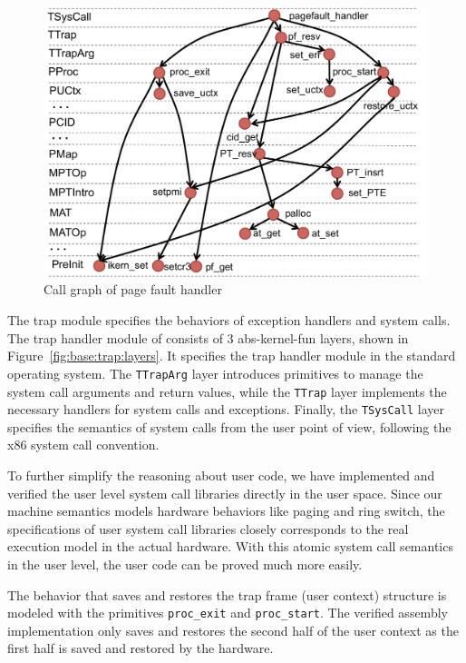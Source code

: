{
\begin{figure}\centering
\includegraphics[scale=0.5]{figs/pagefault}	
\caption{Call graph of page fault handler}
\label{fig:base:trap:pagefault}
\hrulefill
\end{figure}
}

The trap module specifies the behaviors of exception handlers and
\mCTOSbase{} system calls.
The trap handler module of \mCTOSbase{} consists of 3 abs-kernel-fun
layers, shown in Figure~\ref{fig:base:trap:layers}.  It specifies the
trap handler module in the standard operating system.  The
\verb"TTrapArg" layer introduces primitives to manage the system call
arguments and return values, while the \verb"TTrap" layer implements
the necessary handlers for system calls and exceptions.  Finally, the
\verb"TSysCall" layer specifies the semantics of system calls from the
user point of view, following the x86 system call convention.

To further simplify the reasoning about user code, we have implemented and
verified the user level system call libraries directly in the user space.
Since our machine semantics models hardware behaviors
like paging and ring switch, the specifications of user system call
libraries closely corresponds to the real execution model in the actual
hardware. With this atomic system call semantics in the user level,
the user code can be proved much more easily.

The behavior that saves and restores the trap frame (user context)
structure is modeled with the primitives \verb"proc_exit" and
\verb"proc_start".  The verified assembly implementation only saves
and restores the second half of the user context as the first half is
saved and restored by the hardware.  

